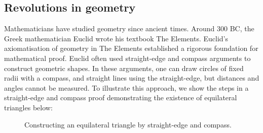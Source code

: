 \documentclass[12pt]{amsart}
\theoremstyle{plain}
\begin{document}
\subsection*{Revolutions in geometry}
Mathematicians have studied geometry since ancient times.
Around 300 BC, the Greek mathematician Euclid wrote his textbook The Elements.
Euclid's axiomatisation of geometry in The Elements established a rigorous foundation for mathematical proof.
Euclid often used straight-edge and compass arguments to construct geometric shapes.
In these arguments, one can draw circles of fixed radii with a compass, and straight lines using the straight-edge, but distances and angles cannot be measured.
To illustrate this approach, we show the steps in a straight-edge and compass proof demonstrating the existence of equilateral triangles below:
\begin{figure}[H]
\begin{center}
\begin{minipage}{0.22\textwidth} %
\end{minipage}%
\hfill %
\begin{minipage}{0.22\textwidth} %
\end{minipage}%
\hfill
\begin{minipage}{0.22\textwidth} %
\end{minipage}%
\hfill
\begin{minipage}{0.22\textwidth} %
\end{minipage}
\end{center}
\caption{Constructing an equilateral triangle by straight-edge and compass.}
\end{figure}
\end{document}
